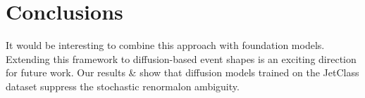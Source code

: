 \section{Conclusions}\label{sec:conclusions}

It would be interesting to combine this approach with foundation models.
Extending this framework to diffusion-based event shapes is an exciting
direction for future work. Our results & show that diffusion models
trained on the JetClass dataset suppress the stochastic renormalon
ambiguity.

